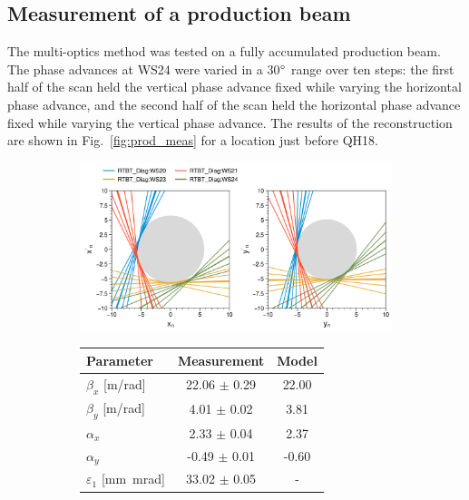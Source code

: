 \subsection{Measurement of a production beam}

The multi-optics method was tested on a fully accumulated production beam. The phase advances at WS24 were varied in a 30$\degree$ range over ten steps: the first half of the scan held the vertical phase advance fixed while varying the horizontal phase advance, and the second half of the scan held the horizontal phase advance fixed while varying the vertical phase advance. The results of the reconstruction are shown in Fig.~\ref{fig:prod_meas} for a location just before QH18.
%
\begin{figure}[!p]
    \centering
    \begin{subfigure}{0.8\textwidth}
        \centering
        \includegraphics[width=\textwidth]{Images/chapter4/prod_meas_lines.png}  
    \end{subfigure}
    \par\medskip
    \begin{subfigure}{0.6\textwidth}
        \centering
        \begin{tabular}{lcc}
            \small\textbf{Parameter} & \small\textbf{Measurement} & \small\textbf{Model} \\
            \midrule
            \small$\beta_x$ [m/rad] & \small22.06 $\pm$ 0.29 & \small22.00 \\
            \small$\beta_y$ [m/rad] & \small4.01 $\pm$ 0.02 & \small3.81 \\
            \small$\alpha_x$ & \small2.33 $\pm$ 0.04 & \small2.37 \\
            \small$\alpha_y$ & \small-0.49 $\pm$ 0.01 & \small-0.60 \\
            \small$\varepsilon_1$ [mm~mrad] & \small33.02 $\pm$ \small0.05 & - \\

\end{tabular}
\end{subfigure}
\end{figure}
